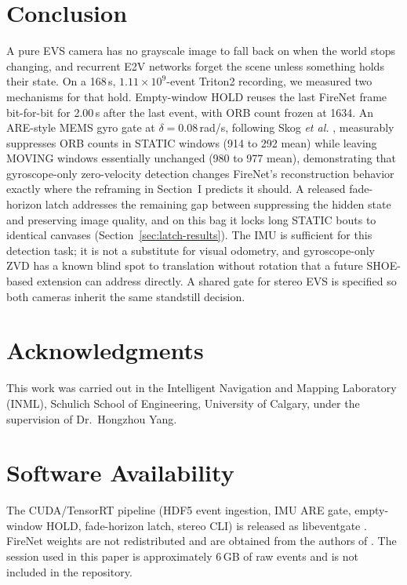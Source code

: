 \documentclass[journal]{IEEEtran}
\begin{document}
\section{Conclusion}
A pure EVS camera has no grayscale image to fall back on when the world stops
changing, and recurrent E2V networks forget the scene unless something holds
their state. On a 168\,s, \(1.11\times 10^{9}\)-event Triton2 recording, we
measured two mechanisms for that hold. Empty-window HOLD reuses the last FireNet
frame bit-for-bit for 2.00\,s after the last event, with ORB count frozen at
1634. An ARE-style MEMS gyro gate at \(\delta = 0.08\)\,rad/s, following Skog
\textit{et al.} \cite{skog2010tbe}, measurably suppresses ORB counts in STATIC
windows (914 to 292 mean) while leaving MOVING windows essentially unchanged
(980 to 977 mean), demonstrating that gyroscope-only zero-velocity detection
changes FireNet's reconstruction behavior exactly where the reframing in
Section~I predicts it should. A released fade-horizon latch addresses the
remaining gap between suppressing the hidden state and preserving image quality,
and on this bag it locks long STATIC bouts to identical canvases
(Section~\ref{sec:latch-results}). The IMU is sufficient for this detection
task; it is not a substitute for visual odometry, and gyroscope-only ZVD has a
known blind spot to translation without rotation that a future SHOE-based
extension can address directly. A shared gate for stereo EVS is specified so
both cameras inherit the same standstill decision.

\section*{Acknowledgments}
This work was carried out in the Intelligent Navigation and Mapping Laboratory
(INML), Schulich School of Engineering, University of Calgary, under the
supervision of Dr.~Hongzhou Yang.

\section*{Software Availability}
The CUDA/TensorRT pipeline (HDF5 event ingestion, IMU ARE gate, empty-window
HOLD, fade-horizon latch, stereo CLI) is released as libeventgate
\cite{libeventgate}. FireNet weights are not redistributed and are obtained from
the authors of \cite{scheerlinck2020}. The session used in this paper is
approximately 6\,GB of raw events and is not included in the repository.

\appendices
\end{document}
